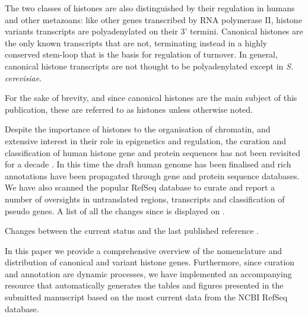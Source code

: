 \documentclass[10pt,a4paper,twocolumn,article]{memoir}
\begin{document}
    The two classes of histones are also distinguished by their regulation in humans and other
    metazoans: like other genes transcribed by RNA polymerase II,  histone variants transcripts
    are polyadenylated on their 3' termini. Canonical histones are the only known transcripts
    that are not, terminating instead in a highly conserved stem-loop that is the basis for
    regulation of turnover. In general, canonical histone transcripts are not thought to be
    polyadenylated except in \textit{S. cerevisiae}.

    For the sake of brevity, and since canonical histones are the main subject of this
    publication, these are referred to as histones unless otherwise noted.

    Despite the importance of histones to the organisation of chromatin, and extensive interest
    in their role in epigenetics and regulation, the curation and classification of human histone
    gene and protein sequences has not been revisited for a decade \citep{Marzluff02}. In this time
    the draft human genome has been finalised and rich annotations have been propagated through
    gene and protein sequence databases. We have also scanned the popular RefSeq
    database to curate and report a number of oversights in untranslated regions, transcripts and
    classification of pseudo genes. A list of all the changes since \cite{Marzluff02} is 
    displayed on .

    \begin{table}
      \caption{Changes between the current status and the last published reference \citep{Marzluff02}.}
      \label{tab:difference-from-Marzluff02}
      \centering
      
    \end{table}

    In this paper we provide a comprehensive overview of the nomenclature and distribution
    of canonical and variant histone genes. Furthermore, since curation and annotation are
    dynamic processes, we have implemented an accompanying resource that automatically generates
    the tables and figures presented in the submitted manuscript based
    on the most current data from the NCBI RefSeq database.


\end{document}
